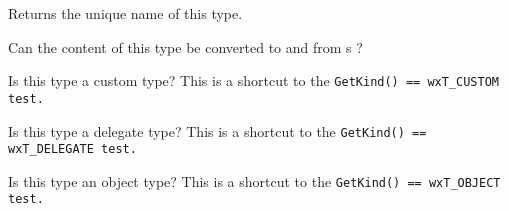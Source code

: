 \label{wxtypeinfogettypename}


Returns the unique name of this type.


\label{wxtypeinfohasstringconverters}


Can the content of this type be converted to and from s ?


\label{wxtypeinfoiscustomtype}


Is this type a custom type?
This is a shortcut to the \tt{GetKind() == wxT_CUSTOM} test.


\label{wxtypeinfoisdelegatetype}


Is this type a delegate type?
This is a shortcut to the \tt{GetKind() == wxT_DELEGATE} test.


\label{wxtypeinfoisobjecttype}


Is this type an object type?
This is a shortcut to the \tt{GetKind() == wxT_OBJECT} test.
